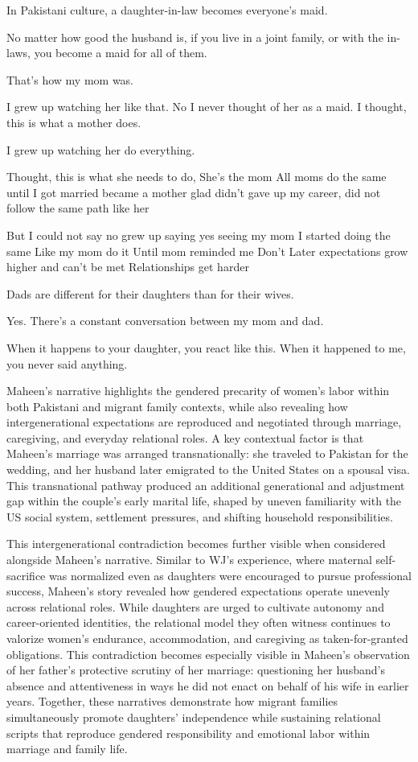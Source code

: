 \begin{FoundPoem}
In Pakistani culture,
a daughter-in-law becomes
everyone’s maid.

No matter how good the husband is,
if you live in a joint family,
or with the in-laws,
you become
a maid for all of them.

That’s how my mom was.

I grew up watching her like that.
No
I never thought of her as a maid.
I thought,
this is what a mother does.

I grew up watching her do everything. 

Thought, this is what she needs to do,		
She’s the mom
All moms
 do the same 
until I got married 
        became a mother
glad
didn’t gave up my career, 
did not follow the same path like her

But
I could not say no
grew up saying yes
seeing my mom 
I started doing the same
Like my mom do it
Until
mom reminded me 
Don’t 
Later
expectations grow higher
and can’t be met
Relationships get harder 

Dads are different
for their daughters
than for their wives.

Yes.
There’s a constant conversation
between my mom and dad.

When it happens to your daughter,
you react like this.
When it happened to me,
you never said anything.

\end{FoundPoem}

Maheen’s narrative highlights the gendered precarity of women’s labor within both Pakistani and migrant family contexts, while also revealing how intergenerational expectations are reproduced and negotiated through marriage, caregiving, and everyday relational roles. A key contextual factor is that Maheen’s marriage was arranged transnationally: she traveled to Pakistan for the wedding, and her husband later emigrated to the United States on a spousal visa. This transnational pathway produced an additional generational and adjustment gap within the couple’s early marital life, shaped by uneven familiarity with the US social system, settlement pressures, and shifting household responsibilities.

This intergenerational contradiction becomes further visible when considered alongside Maheen’s narrative. Similar to WJ’s experience, where maternal self-sacrifice was normalized even as daughters were encouraged to pursue professional success, Maheen’s story revealed how gendered expectations operate unevenly across relational roles. While daughters are urged to cultivate autonomy and career-oriented identities, the relational model they often witness continues to valorize women’s endurance, accommodation, and caregiving as taken-for-granted obligations. This contradiction becomes especially visible in Maheen’s observation of her father’s protective scrutiny of her marriage: questioning her husband’s absence and attentiveness in ways he did not enact on behalf of his wife in earlier years. Together, these narratives demonstrate how migrant families simultaneously promote daughters’ independence while sustaining relational scripts that reproduce gendered responsibility and emotional labor within marriage and family life.


